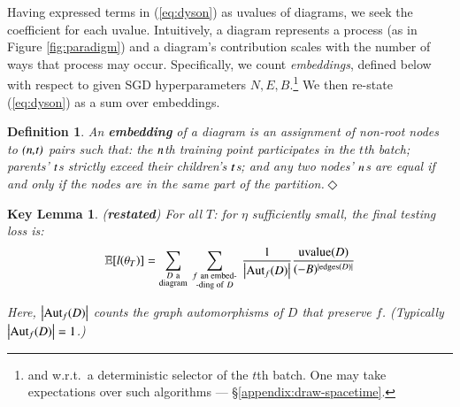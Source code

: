 \documentclass[anon,12pt]{colt2021} %
\newtheorem*{klem*}{Key Lemma}
\newtheorem{dfn}{Definition}
\newcommand{\wabs}[1]{\left|#1\right|}
\newcommand{\Aut}{\text{\textnormal{Aut}}}
\newcommand{\uvalue}{\text{\textnormal{uvalue}}}
\newcommand{\edges}{\text{\textnormal{edges}}}
\newcommand{\expc}{\mathbb{E}}
\newcommand{\mend}{\hfill $\Diamond$}
\begin{document}
            Having expressed terms in (\ref{eq:dyson}) as uvalues of
            diagrams, we seek the coefficient for each uvalue.  Intuitively, a
            diagram represents a process (as in Figure \ref{fig:paradigm}) and
            a diagram's contribution scales with the number of ways that
            process may occur.
            Specifically, we count \emph{embeddings}, defined below with
            respect to given SGD hyperparameters $N,E,B$.\footnote{
                and w.r.t.\ a deterministic selector of the
                $t$th batch.  One may take expectations over such
                algorithms --- \S\ref{appendix:draw-spacetime}. 
            }
            We then re-state (\ref{eq:dyson}) as a sum over embeddings. 
            \begin{dfn}
                \emph{An \textbf{embedding} of a diagram is an assignment of non-root
                nodes to $\emph{(n,t)}$ pairs such that: the $\emph{n}$th
                training point participates in the $t$th batch; parents'
                $\emph{t}$s strictly exceed their children's $\emph{t}$s; and
                any two nodes' $\emph{n}$s are equal if and only if the nodes
                are in the same part of the partition.}\mend 
            \end{dfn}
            \begin{klem*}\emph{(\textbf{restated})} %
                For all $T$: for $\eta$ sufficiently small, the final testing
                loss is:
                \vspace{-0.15cm}
                \begin{equation}\label{eq:sgdcoef}
                    \expc[l(\theta_T)]=
                    \sum_{\substack{D~\text{a} \\ \text{diagram}}}
                    ~
                    \sum_{\substack{f~\text{an embed-} \\ \text{-ding of}~D}}
                    ~
                        \frac{1}{\wabs{\Aut_f(D)}}
                    \frac{\uvalue(D)}{(-B)^{|\edges(D)|}}
                \end{equation}

                \vspace{-0.25cm}
                \noindent
                Here, $\wabs{\Aut_f(D)}$ counts the graph automorphisms of $D$
                that preserve $f$. (Typically $\wabs{\Aut_f(D)}=1$.)%
            \end{klem*}
\end{document}
